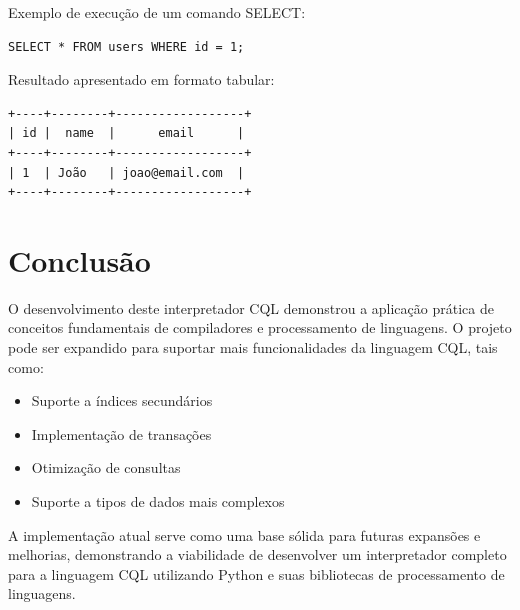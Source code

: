 \documentclass[12pt]{article}
\begin{document}
Exemplo de execução de um comando SELECT:

\begin{verbatim}
SELECT * FROM users WHERE id = 1;
\end{verbatim}

Resultado apresentado em formato tabular:
\begin{verbatim}
+----+--------+------------------+
| id |  name  |      email      |
+----+--------+------------------+
| 1  | João   | joao@email.com  |
+----+--------+------------------+
\end{verbatim}

\section{Conclusão}
O desenvolvimento deste interpretador CQL demonstrou a aplicação prática de conceitos 
fundamentais de compiladores e processamento de linguagens. O projeto pode ser expandido 
para suportar mais funcionalidades da linguagem CQL, tais como:
\begin{itemize}
    \item Suporte a índices secundários
    \item Implementação de transações
    \item Otimização de consultas
    \item Suporte a tipos de dados mais complexos
\end{itemize}

A implementação atual serve como uma base sólida para futuras expansões e melhorias, 
demonstrando a viabilidade de desenvolver um interpretador completo para a linguagem CQL 
utilizando Python e suas bibliotecas de processamento de linguagens.
\end{document}
